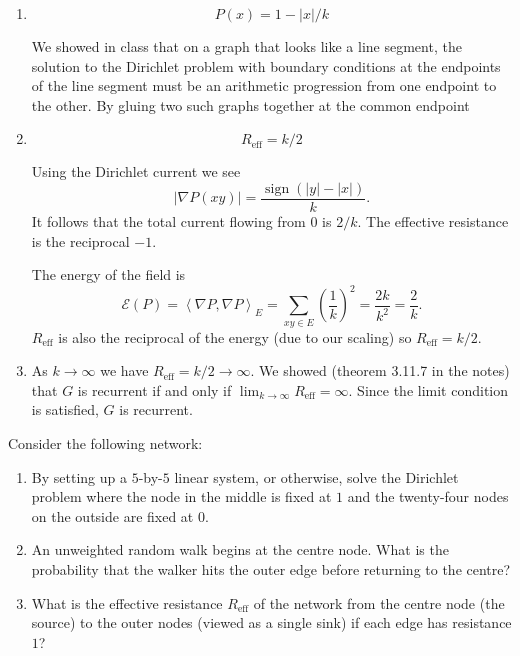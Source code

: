 \documentclass[12 pt, letterpaper]{hmcpset}
\begin{document}
\begin{solution}
	\begin{enumerate}
		\item
			\[
				\boxed{
					P(x) = 1 - \lvert x \rvert / k
				}
			\]

			We showed in class that on a graph that looks like a line segment, the solution to the Dirichlet problem with boundary conditions at the endpoints of the line segment must be an arithmetic progression from one endpoint to the other. By gluing two such graphs together at the common endpoint

		\item
			\[
				\boxed{
					R_{\text{eff}} = k/2
				}
			\]

			Using the Dirichlet current we see
			\[
				\lvert \nabla P(xy) \rvert = \frac{\operatorname{sign}(\lvert y \rvert - \lvert x \rvert)}{k}.
			\]
			It follows that the total current flowing from $0$ is $2 / k$. The effective resistance is the reciprocal $-1$.

			The energy of the field is
			\[
				\mathcal{E}(P) = \left < \nabla P, \nabla P \right >_{E} = \sum_{xy \in E} \left ( \frac{1}{k} \right )^{2} = \frac{2k}{k^{2}} = \frac{2}{k}.
			\]
			$R_{\text{eff}}$ is also the reciprocal of the energy (due to our scaling) so $R_{\text{eff}} = k / 2$.

		\item As $k \to \infty$ we have $R_{\text{eff}} = k / 2 \to \infty$. We showed (theorem 3.11.7 in the notes) that $G$ is recurrent if and only if $\lim_{k \to \infty} R_{\text{eff}} = \infty$. Since the limit condition is satisfied, $G$ is recurrent.
	\end{enumerate}
\end{solution}

\pagebreak

\begin{problem}[46.]
	Consider the following network:
	\begin{enumerate}
		\item By setting up a $5$-by-$5$ linear system, or otherwise, solve the Dirichlet problem where the node in the middle is fixed at $1$ and the twenty-four nodes on the outside are fixed at $0$.

		\item An unweighted random walk begins at the centre node. What is the probability that the walker hits the outer edge before returning to the centre?

		\item What is the effective resistance $R_{\text{eff}}$ of the network from the centre node (the source) to the outer nodes (viewed as a single sink) if each edge has resistance $1$?
	\end{enumerate}
\end{problem}
\end{document}

